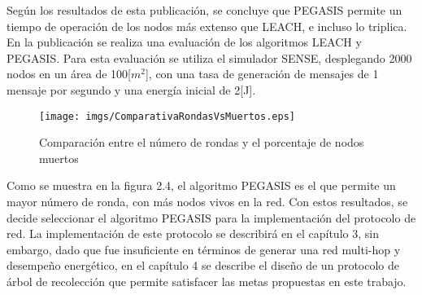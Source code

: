 Según los resultados de esta publicación, se concluye que PEGASIS  permite un tiempo de operación de los nodos más extenso que LEACH, e incluso lo triplica.\\

En la publicación \cite{PaperComparacion} se realiza una evaluación de los algoritmos LEACH y PEGASIS. Para esta evaluación se utiliza el simulador SENSE, desplegando 2000 nodos en un área de 100[$m^2$], con una tasa de generación de mensajes de 1 mensaje por segundo y una energía inicial de 2[J].

\begin{center}
\begin{figure}[H]
\centering
\texttt{[image: imgs/ComparativaRondasVsMuertos.eps]} 
\caption{Comparación entre el número de rondas y el porcentaje de nodos muertos}
\end{figure}
\end{center}
Como se muestra en la figura 2.4, el algoritmo PEGASIS es el que permite un mayor número de ronda, con más nodos vivos en la red. Con estos resultados, se decide seleccionar el algoritmo PEGASIS para la implementación del protocolo de red. La implementación de este protocolo se describirá en el capítulo 3, sin embargo, dado que fue insuficiente en términos de generar una red multi-hop y desempeño energético, en el capítulo 4 se describe el diseño de un protocolo de árbol de recolección que permite satisfacer las metas propuestas en este trabajo.

